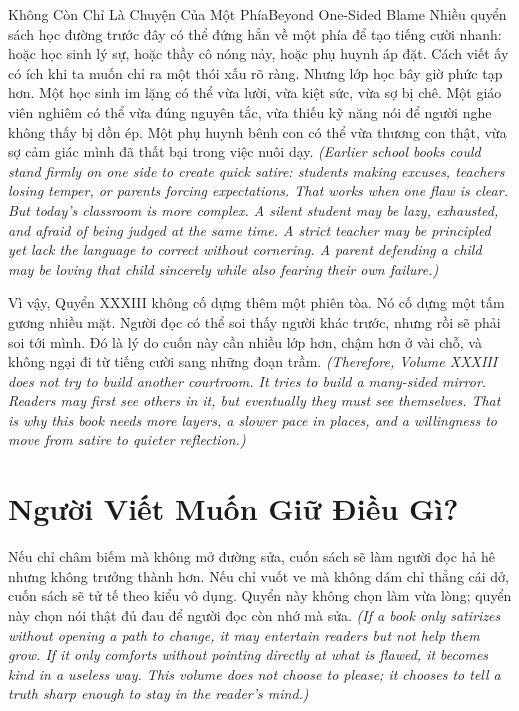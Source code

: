 \begin{truyen}{Không Còn Chỉ Là Chuyện Của Một Phía}{Beyond One-Sided Blame}
Nhiều quyển sách học đường trước đây có thể đứng hẳn về một phía để tạo tiếng cười nhanh: hoặc học sinh lý sự, hoặc thầy cô nóng nảy, hoặc phụ huynh áp đặt. Cách viết ấy có ích khi ta muốn chỉ ra một thói xấu rõ ràng. Nhưng lớp học bây giờ phức tạp hơn. Một học sinh im lặng có thể vừa lười, vừa kiệt sức, vừa sợ bị chê. Một giáo viên nghiêm có thể vừa đúng nguyên tắc, vừa thiếu kỹ năng nói để người nghe không thấy bị dồn ép. Một phụ huynh bênh con có thể vừa thương con thật, vừa sợ cảm giác mình đã thất bại trong việc nuôi dạy.
\textit{(Earlier school books could stand firmly on one side to create quick satire: students making excuses, teachers losing temper, or parents forcing expectations. That works when one flaw is clear. But today's classroom is more complex. A silent student may be lazy, exhausted, and afraid of being judged at the same time. A strict teacher may be principled yet lack the language to correct without cornering. A parent defending a child may be loving that child sincerely while also fearing their own failure.)}

Vì vậy, Quyển XXXIII không cố dựng thêm một phiên tòa. Nó cố dựng một tấm gương nhiều mặt. Người đọc có thể soi thấy người khác trước, nhưng rồi sẽ phải soi tới mình. Đó là lý do cuốn này cần nhiều lớp hơn, chậm hơn ở vài chỗ, và không ngại đi từ tiếng cười sang những đoạn trầm.
\textit{(Therefore, Volume XXXIII does not try to build another courtroom. It tries to build a many-sided mirror. Readers may first see others in it, but eventually they must see themselves. That is why this book needs more layers, a slower pace in places, and a willingness to move from satire to quieter reflection.)}
\end{truyen}

\section*{Người Viết Muốn Giữ Điều Gì?}

\begin{baihoc}
Nếu chỉ châm biếm mà không mở đường sửa, cuốn sách sẽ làm người đọc hả hê nhưng không trưởng thành hơn. Nếu chỉ vuốt ve mà không dám chỉ thẳng cái dở, cuốn sách sẽ tử tế theo kiểu vô dụng. Quyển này không chọn làm vừa lòng; quyển này chọn nói thật đủ đau để người đọc còn nhớ mà sửa.
\textit{(If a book only satirizes without opening a path to change, it may entertain readers but not help them grow. If it only comforts without pointing directly at what is flawed, it becomes kind in a useless way. This volume does not choose to please; it chooses to tell a truth sharp enough to stay in the reader's mind.)}
\end{baihoc}

